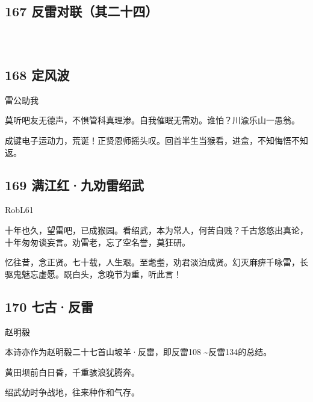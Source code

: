 \hypertarget{ux53cdux96f7ux5bf9ux8054ux5176ux4e8cux5341ux56db}{%
\subsection{167
反雷对联（其二十四）}\label{ux53cdux96f7ux5bf9ux8054ux5176ux4e8cux5341ux56db}}

~\\

\hypertarget{section-2}{%
\section{}\label{section-2}}

\hypertarget{ux5b9aux98ceux6ce2-1}{%
\subsection{168 定风波}\label{ux5b9aux98ceux6ce2-1}}

雷公助我

莫听吧友无德声，不惧管科真理渗。自我催眠无需劝。谁怕？川渝乐山一愚翁。

成键电子运动力，荒诞！正贤恩师摇头叹。回首半生当猴看，进盒，不知悔悟不知返。
~\\

\hypertarget{ux6ee1ux6c5fux7ea2ux4e5dux529dux96f7ux7ecdux6b66}{%
\subsection{169
满江红·九劝雷绍武}\label{ux6ee1ux6c5fux7ea2ux4e5dux529dux96f7ux7ecdux6b66}}

RobL61

十年也久，望雷吧，已成猴园。看绍武，本为常人，何苦自贱？千古悠悠出真论，十年匆匆谈妄言。劝雷老，忘了空名誉，莫狂研。

忆往昔，念正贤。七十载，人生艰。至耄耋，劝君淡泊成贤。幻灭麻痹千咏雷，长驱鬼魅忘虚愿。既白头，念晚节为重，听此言！

\hypertarget{ux4e03ux53e4ux53cdux96f7}{%
\subsection{170 七古·反雷}\label{ux4e03ux53e4ux53cdux96f7}}

赵明毅

本诗亦作为赵明毅二十七首山坡羊·反雷，即反雷108
\textasciitilde 反雷134的总结。

黄田坝前白日昏，千重骇浪犹腾奔。

绍武幼时争战地，往来种作和气存。

